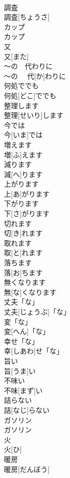 \documentclass[8pt]{extreport}
\begin{document}
\begin{CJK}{UTF8}{min}
\\	調査	
\\	調査[ちょうさ]	
\\	カップ	
\\	カップ	
\\	又	
\\	又[また]	
\\	〜の　代わりに	
\\	〜の　 代[か]わりに	
\\	何処ででも	
\\	何処[どこ]ででも	
\\	整理します	
\\	整理[せいり]します	
\\	今では	
\\	今[いま]では	
\\	増えます	
\\	増[ふ]えます	
\\	減ります	
\\	減[へ]ります	
\\	上がります	
\\	上[あ]がります	
\\	下がります	
\\	下[さ]がります	
\\	切れます	
\\	切[き]れます	
\\	取れます	
\\	取[と]れます	
\\	落ちます	
\\	落[お]ちます	
\\	無くなります	
\\	無[な]くなります	
\\	丈夫「な」	
\\	丈夫[じょうぶ]「な」	
\\	変「な」	
\\	変[へん]「な」	
\\	幸せ「な」	
\\	幸[しあわ]せ「な」	
\\	旨い	
\\	旨[うま]い	
\\	不味い	
\\	不味[まず]い	
\\	詰らない	
\\	詰[なじ]らない	
\\	ガソリン	
\\	ガソリン	
\\	火	
\\	火[ひ]	
\\	暖房	
\\	暖房[だんぼう]	

\end{CJK}
\end{document}
